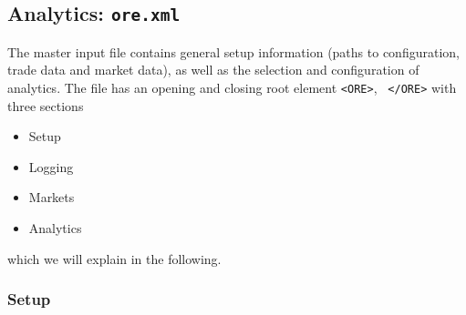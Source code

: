 \subsection{Analytics: {\tt ore.xml}}\label{sec:master_input}

The master input file contains general setup information (paths to configuration, trade data and market data), as well
as the selection and configuration of analytics. The file has an opening and closing root element {\tt <ORE>}, {\tt
  </ORE>} with three sections
\begin{itemize}
\item Setup
\item Logging
\item Markets
\item Analytics
\end{itemize}
which we will explain in the following.

\subsubsection*{Setup}

